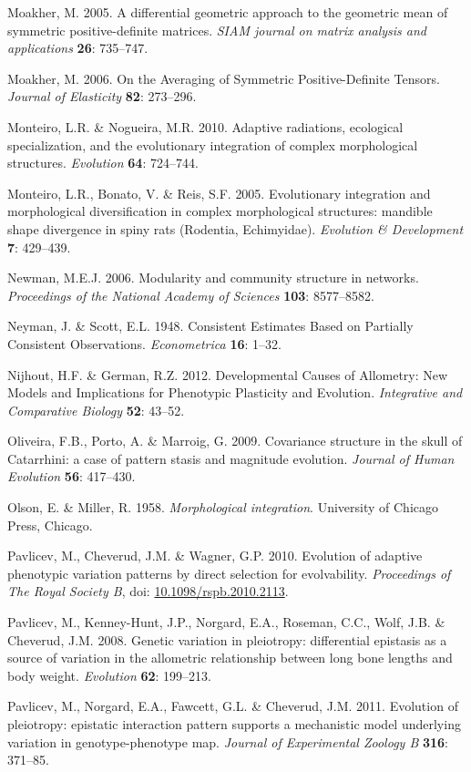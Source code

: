 \documentclass[12pt,twoside]{report}
\begin{document}
Moakher, M. 2005. A differential geometric approach to the geometric
mean of symmetric positive-definite matrices. \emph{SIAM journal on
matrix analysis and applications} \textbf{26}: 735--747.

Moakher, M. 2006. On the Averaging of Symmetric Positive-Definite
Tensors. \emph{Journal of Elasticity} \textbf{82}: 273--296.

Monteiro, L.R. \& Nogueira, M.R. 2010. Adaptive radiations, ecological
specialization, and the evolutionary integration of complex
morphological structures. \emph{Evolution} \textbf{64}: 724--744.

Monteiro, L.R., Bonato, V. \& Reis, S.F. 2005. Evolutionary integration
and morphological diversification in complex morphological structures:
mandible shape divergence in spiny rats (Rodentia, Echimyidae).
\emph{Evolution \& Development} \textbf{7}: 429--439.

Newman, M.E.J. 2006. Modularity and community structure in networks.
\emph{Proceedings of the National Academy of Sciences} \textbf{103}:
8577--8582.

Neyman, J. \& Scott, E.L. 1948. Consistent Estimates Based on Partially
Consistent Observations. \emph{Econometrica} \textbf{16}: 1--32.

Nijhout, H.F. \& German, R.Z. 2012. Developmental Causes of Allometry:
New Models and Implications for Phenotypic Plasticity and Evolution.
\emph{Integrative and Comparative Biology} \textbf{52}: 43--52.

Oliveira, F.B., Porto, A. \& Marroig, G. 2009. Covariance structure in
the skull of Catarrhini: a case of pattern stasis and magnitude
evolution. \emph{Journal of Human Evolution} \textbf{56}: 417--430.

Olson, E. \& Miller, R. 1958. \emph{Morphological integration}.
University of Chicago Press, Chicago.

Pavlicev, M., Cheverud, J.M. \& Wagner, G.P. 2010. Evolution of adaptive
phenotypic variation patterns by direct selection for evolvability.
\emph{Proceedings of The Royal Society B}, doi:
\href{http://dx.doi.org/10.1098/rspb.2010.2113}{10.1098/rspb.2010.2113}.

Pavlicev, M., Kenney-Hunt, J.P., Norgard, E.A., Roseman, C.C., Wolf,
J.B. \& Cheverud, J.M. 2008. Genetic variation in pleiotropy:
differential epistasis as a source of variation in the allometric
relationship between long bone lengths and body weight. \emph{Evolution}
\textbf{62}: 199--213.

Pavlicev, M., Norgard, E.A., Fawcett, G.L. \& Cheverud, J.M. 2011.
Evolution of pleiotropy: epistatic interaction pattern supports a
mechanistic model underlying variation in genotype-phenotype map.
\emph{Journal of Experimental Zoology B} \textbf{316}: 371--85.
\end{document}
